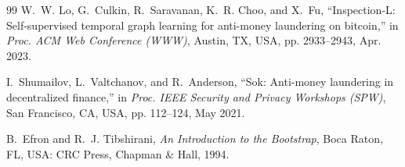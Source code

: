 \begin{thebibliography}{99}
W.~W. Lo, G.~Culkin, R.~Saravanan, K.~R. Choo, and X.~Fu, ``Inspection-L: Self-supervised temporal graph learning for anti-money laundering on bitcoin,'' in \emph{Proc. ACM Web Conference (WWW)}, Austin, TX, USA, pp. 2933--2943, Apr. 2023.

I.~Shumailov, L.~Valtchanov, and R.~Anderson, ``Sok: Anti-money laundering in decentralized finance,'' in \emph{Proc. IEEE Security and Privacy Workshops (SPW)}, San Francisco, CA, USA, pp. 112--124, May 2021.

B.~Efron and R.~J. Tibshirani, \emph{An Introduction to the Bootstrap}, Boca Raton, FL, USA: CRC Press, Chapman \& Hall, 1994.

\end{thebibliography}
